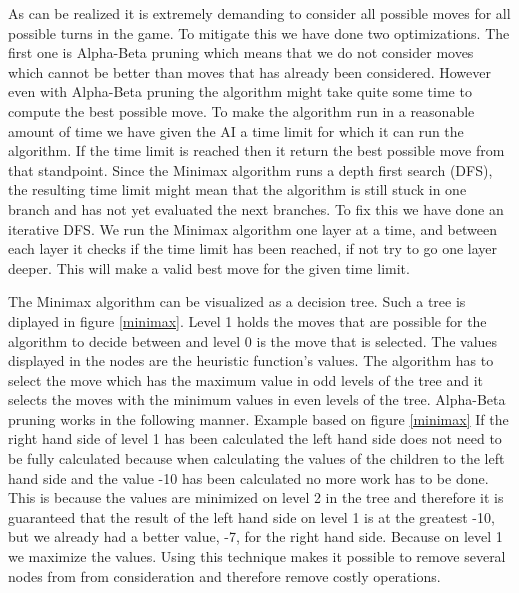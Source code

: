 \documentclass[a4paper]{article}
\begin{document}
As can be realized it is extremely demanding to consider all possible moves for all possible turns in the game. To mitigate this we have done two optimizations. The first one is Alpha-Beta pruning which means that we do not consider moves which cannot be better than moves that has already been considered. However even with Alpha-Beta pruning the algorithm might take quite some time to compute the best possible move. To make the algorithm run in a reasonable amount of time we have given the AI a time limit for which it can run the algorithm. If the time limit is reached then it return the best possible move from that standpoint. Since the Minimax algorithm runs a depth first search (DFS), the resulting time limit might mean that the algorithm is still stuck in one branch and has not yet evaluated the next branches. To fix this we have done an iterative DFS. We run the Minimax algorithm one layer at a time, and between each layer it checks if the time limit has been reached, if not try to go one layer deeper. This will make a valid best move for the given time limit.

The Minimax algorithm can be visualized as a decision tree. Such a tree is diplayed in figure \ref{minimax}. Level 1 holds the moves that are possible for the algorithm to decide between and level 0 is the move that is selected. The values displayed in the nodes are the heuristic function's values. The algorithm has to select the move which has the maximum value in odd levels of the tree and it selects the moves with the minimum values in even levels of the tree. Alpha-Beta pruning works in the following manner. Example based on figure \ref{minimax} If the right hand side of level 1 has been calculated the left hand side does not need to be fully calculated because when calculating the values of the children to the left hand side and the value -10 has been calculated no more work has to be done. This is because the values are minimized on level 2 in the tree and therefore it is guaranteed that the result of the left hand side on level 1 is at the greatest -10, but we already had a better value, -7, for the right hand side. Because on level 1 we maximize the values. Using this technique makes it possible to remove several nodes from from consideration and therefore remove costly operations.
\end{document}
